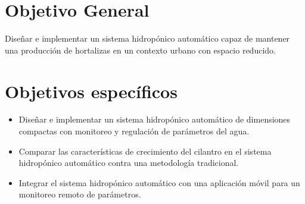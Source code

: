 \section{Objetivo General}
Diseñar e implementar un sistema hidropónico automático capaz de mantener una producción de hortalizas en un contexto urbano con espacio reducido.

\section{Objetivos específicos}
\begin{itemize}
	\item Diseñar e implementar un sistema hidropónico automático de dimensiones compactas con monitoreo y regulación de parámetros del agua. 
	\item Comparar las características de crecimiento del cilantro en el sistema hidropónico automático contra una metodología tradicional.
	\item Integrar el sistema hidropónico automático con una aplicación móvil para un monitoreo remoto de parámetros.
\end{itemize}

